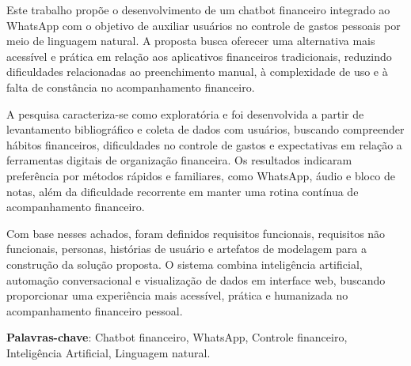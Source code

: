 
\setlength{\absparsep}{18pt}
\begin{resumo}
Este trabalho propõe o desenvolvimento de um chatbot financeiro integrado ao WhatsApp com o objetivo de auxiliar usuários no controle de gastos pessoais por meio de linguagem natural. A proposta busca oferecer uma alternativa mais acessível e prática em relação aos aplicativos financeiros tradicionais, reduzindo dificuldades relacionadas ao preenchimento manual, à complexidade de uso e à falta de constância no acompanhamento financeiro.
    
A pesquisa caracteriza-se como exploratória e foi desenvolvida a partir de levantamento bibliográfico e coleta de dados com usuários, buscando compreender hábitos financeiros, dificuldades no controle de gastos e expectativas em relação a ferramentas digitais de organização financeira. Os resultados indicaram preferência por métodos rápidos e familiares, como WhatsApp, áudio e bloco de notas, além da dificuldade recorrente em manter uma rotina contínua de acompanhamento financeiro.

Com base nesses achados, foram definidos requisitos funcionais, requisitos não funcionais, personas, histórias de usuário e artefatos de modelagem para a construção da solução proposta. O sistema combina inteligência artificial, automação conversacional e visualização de dados em interface web, buscando proporcionar uma experiência mais acessível, prática e humanizada no acompanhamento financeiro pessoal.

\textbf{Palavras-chave}: Chatbot financeiro, WhatsApp, Controle financeiro, Inteligência Artificial, Linguagem natural.
\end{resumo}

